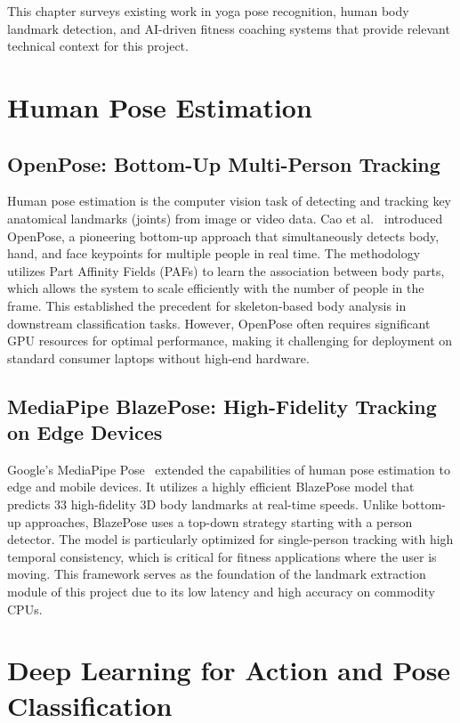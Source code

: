 
This chapter surveys existing work in yoga pose recognition, human body landmark detection, and AI-driven fitness coaching systems that provide relevant technical context for this project.

\section{Human Pose Estimation}
\subsection{OpenPose: Bottom-Up Multi-Person Tracking}
Human pose estimation is the computer vision task of detecting and tracking key anatomical landmarks (joints) from image or video data. Cao et al.~\cite{cao2017realtime} introduced OpenPose, a pioneering bottom-up approach that simultaneously detects body, hand, and face keypoints for multiple people in real time. The methodology utilizes Part Affinity Fields (PAFs) to learn the association between body parts, which allows the system to scale efficiently with the number of people in the frame. This established the precedent for skeleton-based body analysis in downstream classification tasks. However, OpenPose often requires significant GPU resources for optimal performance, making it challenging for deployment on standard consumer laptops without high-end hardware.

\subsection{MediaPipe BlazePose: High-Fidelity Tracking on Edge Devices}
Google's MediaPipe Pose~\cite{mediapipe2020} extended the capabilities of human pose estimation to edge and mobile devices. It utilizes a highly efficient BlazePose model that predicts 33 high-fidelity 3D body landmarks at real-time speeds. Unlike bottom-up approaches, BlazePose uses a top-down strategy starting with a person detector. The model is particularly optimized for single-person tracking with high temporal consistency, which is critical for fitness applications where the user is moving. This framework serves as the foundation of the landmark extraction module of this project due to its low latency and high accuracy on commodity CPUs.

\section{Deep Learning for Action and Pose Classification}
